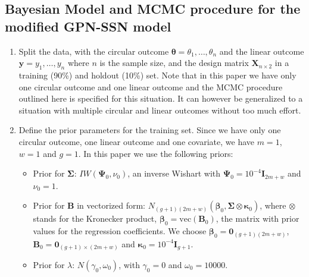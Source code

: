 \documentclass[12pt,]{article}
\begin{document}
\newpage
\subsection{Bayesian Model and MCMC procedure for the modified GPN-SSN model}\label{A3}

\begin{enumerate}
\item Split the data, with the circular outcome $\boldsymbol{\theta} = \theta_1, \dots, \theta_n$ and the linear outcome $\boldsymbol{y} = y_1, \dots, y_n$ where $n$ is the sample size, and the design matrix $\boldsymbol{X}_{n \times 2}$ in a training (90\%) and holdout (10\%) set. Note that in this paper we have only one circular outcome and one linear outcome and the MCMC procedure outlined here is specified for this situation. It can however be generalized to a situation with multiple circular and linear outcomes without too much effort. 
\item Define the prior parameters for the training set. Since we have only one circular outcome, one linear outcome and one covariate, we have $m = 1$, $w = 1$ and $g = 1$. In this paper we use the following priors:

\begin{itemize}
\item Prior for $\boldsymbol{\Sigma}$: $IW(\boldsymbol{\Psi}_0, \nu_0)$, an inverse Wishart with $\boldsymbol{\Psi}_0 = 10^{-4}\boldsymbol{I}_{2m + w}$ and $\nu_0 = 1$.   
\item Prior for $\boldsymbol{B}$ in vectorized form: $N_{(g + 1)(2m + w)}(\boldsymbol{\beta}_0, \boldsymbol{\Sigma}  \otimes \boldsymbol{\kappa}_0)$, where $\otimes$ stands for the Kronecker product, $\boldsymbol{\beta}_0 = \text{vec}(\boldsymbol{B}_0)$, the matrix with prior values for the regression coefficients. We choose $\boldsymbol{\beta}_0 = \boldsymbol{0}_{(g + 1)(2m + w)}$, $\boldsymbol{B}_0 = \boldsymbol{0}_{(g + 1) \times (2m + w)}$ and $\boldsymbol{\kappa}_0 = 10^{-4}\boldsymbol{I}_{g + 1}$.
\item Prior for $\lambda$: $N(\gamma_0, \omega_0)$, with $\gamma_0 = 0$ and $\omega_0 = 10000$.
\end{itemize}


\end{enumerate}
\end{document}
